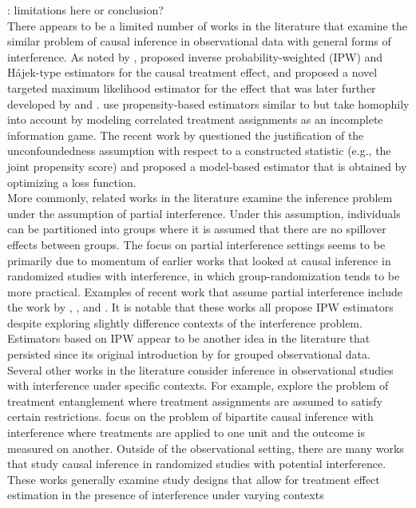 \documentclass[10pt]{article}
\begin{document}
\todo: limitations here or conclusion?
\\

There appears to be a limited number of works in the literature that examine the similar problem of causal inference in observational data with general forms of interference. As noted by \citeauthor{Forastiere:2021}, \textcite{Liu:2016} proposed inverse probability-weighted (IPW) and H\'{a}jek-type estimators for the causal treatment effect, and \textcite{VanDerLaan:2014} proposed a novel targeted maximum likelihood estimator for the effect that was later further developed by \textcite{Sofrygin:2017} and \textcite{Ogburn:2017}. \textcite{Jackson:2020} use propensity-based estimators similar to \textcite{Forastiere:2021} but take homophily into account by modeling correlated treatment assignments as an incomplete information game. The recent work by \textcite{Sanchez:2021} questioned the justification of the unconfoundedness assumption with respect to a constructed statistic (e.g., the joint propensity score) and proposed a model-based estimator that is obtained by optimizing a loss function. \todo
\\

More commonly, related works in the literature examine the inference problem under the assumption of partial interference. Under this assumption, individuals can be partitioned into groups where it is assumed that there are no spillover effects between groups. The focus on partial interference settings seems to be primarily due to momentum of earlier works \parencite[e.g.,][]{Sobel:2006,Hudgens:2008} that looked at causal inference in randomized studies with interference, in which group-randomization tends to be more practical. Examples of recent work that assume partial interference include the work by \textcite{Liu:2019}, \textcite{Barkley:2020}, and \textcite{Qu:2021}. It is notable that these works all propose IPW estimators despite exploring slightly difference contexts of the interference problem. Estimators based on IPW appear to be another idea in the literature that persisted since its original introduction by \textcite{Tchetgen:2012} for grouped observational data.
\\

Several other works in the literature consider inference in observational studies with interference under specific contexts. For example, \textcite{Toulis:2018} explore the problem of treatment entanglement where treatment assignments are assumed to satisfy certain restrictions. \textcite{Zigler:2021} focus on the problem of bipartite causal inference with interference where treatments are applied to one unit and the outcome is measured on another. Outside of the observational setting, there are many works that study causal inference in randomized studies with potential interference. These works generally examine study designs that allow for treatment effect estimation in the presence of interference under varying contexts \parencite[e.g.,][]{Saveski:2017,Jagadeesan:2020,Imai:2021,Doudchenko:2020}
\end{document}
